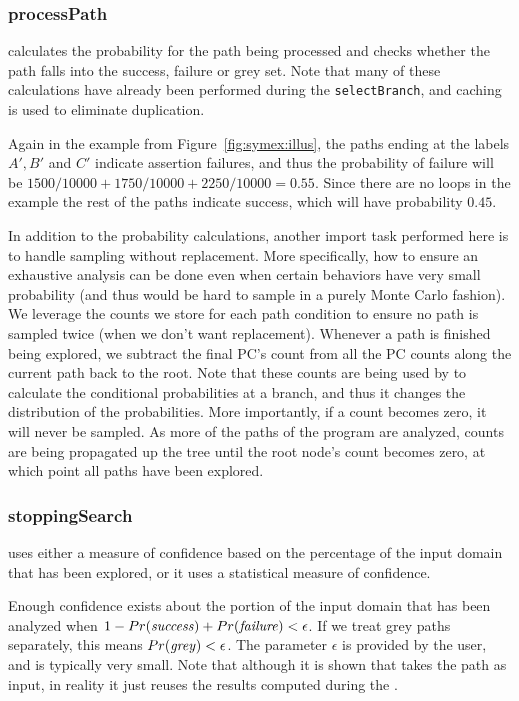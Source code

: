 \subsubsection{processPath} calculates the probability for the path being processed and checks whether the path falls into the success, failure or grey set. Note that many of these calculations have already been performed during the {\tt selectBranch}, and caching is used to eliminate duplication. 

Again in the example from Figure~\ref{fig:symex:illus}, the paths ending at the labels $A', B'$ and $C'$ indicate assertion failures, and thus the probability of failure will be $1500/10000 + 1750/10000 + 2250/10000 = 0.55$.  Since there are no loops in the example the rest of the paths indicate success, which will have probability $0.45$.

In addition to the probability calculations, another import task performed here is to handle sampling without replacement. More specifically, how to ensure an exhaustive analysis can be done even when certain behaviors have very small probability (and thus would be hard to sample in a purely Monte Carlo fashion). We leverage the counts we store for each path condition to ensure no path is sampled twice (when we don't want replacement). Whenever a path is finished being explored, we subtract the final PC's count from all the PC counts along the current path back to the root. Note that these counts are being used by  to calculate the conditional probabilities at a branch, and thus it changes the distribution of the probabilities. More importantly, if a count becomes zero, it will never be sampled. As more of the paths of the program are analyzed, 
counts are being propagated up the tree until the root node's count becomes zero, at which point all paths have been explored. 

\subsubsection{stoppingSearch} uses either a measure of confidence based on the percentage of the input domain that has been explored, or it uses a statistical measure of confidence. 

Enough confidence exists about the portion of the input domain that has been analyzed when  $1 - Pr(\mathit{success}) + Pr(\mathit{failure}) < \epsilon$.  If we treat grey paths separately, this means $Pr(\mathit{grey}) < \epsilon$. The parameter $\epsilon$ is provided by the user, and is typically very small. Note that although it is shown that  takes the path as input, in reality it just reuses the results computed during the . 

